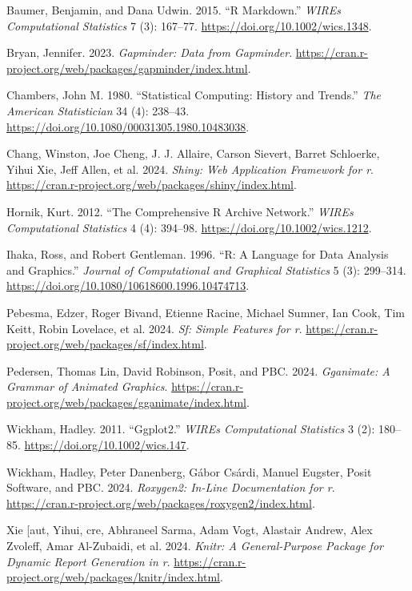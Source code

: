 \documentclass[
]{book}
\newlength{\cslhangindent}
\newenvironment{CSLReferences}[2] %
 {\begin{list}{}{%
  \setlength{\itemindent}{0pt}
  \setlength{\leftmargin}{0pt}
  \setlength{\parsep}{0pt}
  \ifodd #1
   \setlength{\leftmargin}{\cslhangindent}
   \setlength{\itemindent}{-1\cslhangindent}
  \fi
  \setlength{\itemsep}{#2\baselineskip}}}
 {\end{list}}
\begin{document}
\label{refs}
\begin{CSLReferences}{1}{0}
Baumer, Benjamin, and Dana Udwin. 2015. {``R Markdown.''} \emph{WIREs Computational Statistics} 7 (3): 167--77. \url{https://doi.org/10.1002/wics.1348}.

Bryan, Jennifer. 2023. \emph{Gapminder: Data from Gapminder}. \url{https://cran.r-project.org/web/packages/gapminder/index.html}.

Chambers, John M. 1980. {``Statistical Computing: History and Trends.''} \emph{The American Statistician} 34 (4): 238--43. \url{https://doi.org/10.1080/00031305.1980.10483038}.

Chang, Winston, Joe Cheng, J. J. Allaire, Carson Sievert, Barret Schloerke, Yihui Xie, Jeff Allen, et al. 2024. \emph{Shiny: Web Application Framework for r}. \url{https://cran.r-project.org/web/packages/shiny/index.html}.

Hornik, Kurt. 2012. {``The Comprehensive R Archive Network.''} \emph{WIREs Computational Statistics} 4 (4): 394--98. \url{https://doi.org/10.1002/wics.1212}.

Ihaka, Ross, and Robert Gentleman. 1996. {``R: A Language for Data Analysis and Graphics.''} \emph{Journal of Computational and Graphical Statistics} 5 (3): 299--314. \url{https://doi.org/10.1080/10618600.1996.10474713}.

Pebesma, Edzer, Roger Bivand, Etienne Racine, Michael Sumner, Ian Cook, Tim Keitt, Robin Lovelace, et al. 2024. \emph{Sf: Simple Features for r}. \url{https://cran.r-project.org/web/packages/sf/index.html}.

Pedersen, Thomas Lin, David Robinson, Posit, and PBC. 2024. \emph{Gganimate: A Grammar of Animated Graphics}. \url{https://cran.r-project.org/web/packages/gganimate/index.html}.

Wickham, Hadley. 2011. {``Ggplot2.''} \emph{WIREs Computational Statistics} 3 (2): 180--85. \url{https://doi.org/10.1002/wics.147}.

Wickham, Hadley, Peter Danenberg, Gábor Csárdi, Manuel Eugster, Posit Software, and PBC. 2024. \emph{Roxygen2: In-Line Documentation for r}. \url{https://cran.r-project.org/web/packages/roxygen2/index.html}.

Xie {[}aut, Yihui, cre, Abhraneel Sarma, Adam Vogt, Alastair Andrew, Alex Zvoleff, Amar Al-Zubaidi, et al. 2024. \emph{Knitr: A General-Purpose Package for Dynamic Report Generation in r}. \url{https://cran.r-project.org/web/packages/knitr/index.html}.

\end{CSLReferences}
\end{document}
